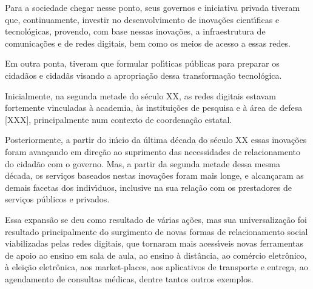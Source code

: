 \documentclass[
12pt,		%
openright,	%
twoside,  %
a4paper,			%
chapter=TITLE,		%
english,			%
french,				%
spanish,			%
brazil				%
]{USPSC-classe/USPSC}
\begin{document}
Para a sociedade chegar nesse ponto, seus governos e iniciativa privada tiveram que, continuamente, investir no desenvolvimento de inova\c{c}\~oes cient\'{\i}ficas e tecnol\'ogicas,  provendo, com base nessas inova\c{c}\~oes, a infraestrutura de comunica\c{c}\~oes e de redes digitais, bem como os meios de acesso a essas redes.










Em outra ponta, tiveram que formular pol\'{\i}ticas p\'ublicas para preparar os cidad\~aos e cidad\~as visando a apropria\c{c}\~ao dessa transforma\c{c}\~ao tecnol\'ogica.










Inicialmente, na segunda metade do s\'eculo XX, as redes digitais estavam fortemente vinculadas \`a academia, \`as institui\c{c}\~oes de pesquisa e \`a \'area de defesa [XXX], principalmente num contexto de coordena\c{c}\~ao estatal.










Posteriormente, a partir do in\'{\i}cio da \'ultima d\'ecada do s\'eculo XX essas inova\c{c}\~oes  foram avan\c{c}ando em dire\c{c}\~ao ao suprimento das necessidades de relacionamento do cidad\~ao com o governo. Mas, a partir da segunda metade dessa mesma d\'ecada, os servi\c{c}os baseados nestas inova\c{c}\~oes foram mais longe, e alcan\c{c}aram  as demais facetas dos indiv\'{\i}duos, inclusive na sua rela\c{c}\~ao com os prestadores de servi\c{c}os p\'ublicos e privados.










Essa expans\~ao se deu como resultado de v\'arias a\c{c}\~oes, mas sua universaliza\c{c}\~ao foi resultado principalmente do surgimento de novas formas de relacionamento social viabilizadas pelas redes digitais, que tornaram mais acess\'{\i}veis novas ferramentas de apoio ao ensino em sala de aula, ao ensino \`a dist\^ancia, ao com\'ercio eletr\^onico, \`a elei\c{c}\~ao eletr\^onica, aos \textquotedbl market-places\textquotedbl , aos aplicativos de transporte e entrega, ao agendamento de consultas m\'edicas, dentre tantos outros exemplos.
\end{document}
